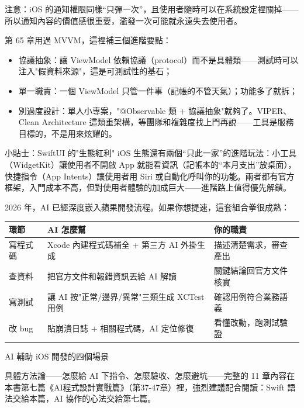 注意：iOS 的通知權限同樣“只彈一次”，且使用者隨時可以在系統設定裡關掉——所以通知內容的價值感很重要，濫發一次可能就永遠失去使用者。


第 65 章用過 MVVM，這裡補三個進階要點：

\begin{itemize}
  \item 協議抽象：讓 ViewModel 依賴協議（protocol）而不是具體類——測試時可以注入"假資料來源"，這是可測試性的基石；
  \item 單一職責：一個 ViewModel 只管一件事（記帳的不管天氣）；功能多了就拆；
  \item 別過度設計：單人小專案，"@Observable 類 + 協議抽象"就夠了。VIPER、Clean Architecture 這類重架構，等團隊和複雜度找上門再說——工具是服務目標的，不是用來炫耀的。
\end{itemize}

\begin{tcbinfo}{小貼士：SwiftUI 的"生態紅利"}
iOS 生態還有兩個“只此一家”的進階玩法：小工具（WidgetKit）讓使用者不開啟 App 就能看資訊（記帳本的“本月支出”放桌面），快捷指令（App Intents）讓使用者用 Siri 或自動化呼叫你的功能。兩者都有官方框架，入門成本不高，但對使用者體驗的加成巨大——進階路上值得優先解鎖。

\end{tcbinfo}


2026 年，AI 已經深度嵌入蘋果開發流程。如果你想提速，這套組合拳很成熟：

\begin{center}
\begin{tabularx}{\linewidth}{|X|X|X|}
\hline
\textbf{環節} & \textbf{AI 怎麼幫} & \textbf{你的職責} \tabularnewline
\hline
寫程式碼 & Xcode 內建程式碼補全 + 第三方 AI 外掛生成 & 描述清楚需求，審查產出 \tabularnewline
查資料 & 把官方文件和報錯資訊丟給 AI 解讀 & 關鍵結論回官方文件核實 \tabularnewline
寫測試 & 讓 AI 按"正常/邊界/異常"三類生成 XCTest 用例 & 確認用例符合業務語義 \tabularnewline
改 bug & 貼崩潰日誌 + 相關程式碼，AI 定位修復 & 看懂改動，跑測試驗證 \tabularnewline
\hline
\end{tabularx}
\end{center}

\begin{center}\small\color{gray}AI 輔助 iOS 開發的四個場景\end{center}

具體方法論——怎麼給 AI 下指令、怎麼驗收、怎麼避坑——完整的 11 章內容在本書第七篇《AI程式設計實戰篇》（第37-47章）裡，強烈建議配合閱讀：Swift 語法交給本篇，AI 協作的心法交給第七篇。

